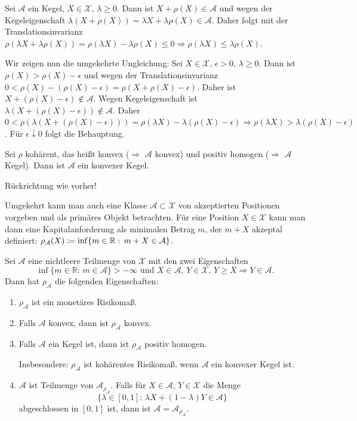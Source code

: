 \documentclass[a4paper,twoside,DIV15,BCOR12mm]{scrbook}
\begin{document}
\begin{beweis}
\begin{enumerate}
Sei $\mathcal{A}$ ein Kegel, $X\in\mathcal{X},\, \lambda\geq 0$. Dann ist $X+\rho(X)\in\mathcal{A}$ und wegen der Kegeleigenschaft $\lambda(X+\rho(X))=\lambda X+\lambda \rho(X)\in\mathcal{A}$. Daher folgt mit der Translationsinvarianz $\rho(\lambda X+\lambda \rho(X))=\rho(\lambda X)-\lambda \rho(X)\leq 0 \Rightarrow \rho(\lambda X)\leq \lambda \rho(X)$.

Wir zeigen nun die umgekehrte Ungleichung: Sei $X\in\mathcal{X},\, \epsilon>0,\, \lambda\geq 0$. Dann ist $\rho(X)>\rho(X)-\epsilon$ und wegen der Translationsinvarianz $0<\rho(X)-(\rho(X)-\epsilon)=\rho(X+\rho(X)-\epsilon)$. Daher ist $X+(\rho(X)-\epsilon)\notin\mathcal{A}$. Wegen Kegeleigenschaft ist $\lambda(X+(\rho(X)-\epsilon))\notin\mathcal{A}$. Daher $0<\rho(\lambda(X+(\rho(X)-\epsilon)))=\rho(\lambda X)-\lambda(\rho(X)-\epsilon) \Rightarrow \rho(\lambda X)>\lambda(\rho(X)-\epsilon)$. Für $\epsilon \downarrow 0$ folgt die Behauptung.

Sei $\rho$ kohärent, das heißt konvex ($\Rightarrow$ $\mathcal{A}$ konvex) und positiv homogen ($\Rightarrow$ $\mathcal{A}$ Kegel). Dann ist $\mathcal{A}$ ein konvexer Kegel.

Rückrichtung wie vorher!
\end{enumerate}
\end{beweis}

Umgekehrt kann man auch eine Klasse $\mathcal{A}\subset \mathcal{X}$ von akzeptierten Positionen vorgeben und als primäres Objekt betrachten. Für eine Position $X\in\mathcal{X}$ kann man dann eine Kapitalanforderung als minimalen Betrag $m$, der $m+X$ akzeptal definiert: $\rho_\mathcal{A}(X)\da\inf\{m\in\mathbb{R}:\, m+X\in\mathcal{A}\}$.

\begin{satz}
Sei $\mathcal{A}$ eine nichtleere Teilmenge von $\mathcal{X}$ mit den zwei Eigenschaften
\[
\inf\{m\in\mathbb{R}:\, m\in\mathcal{A}\}>-\infty \text{ und } X\in\mathcal{A},\, Y\in\mathcal{X},\, Y\geq X \Rightarrow Y\in\mathcal{A}.
\]
Dann hat $\rho_\mathcal{A}$ die folgenden Eigenschaften:
\begin{enumerate}
\item $\rho_\mathcal{A}$ ist ein monetäres Risikomaß.
\item Falls $\mathcal{A}$ konvex, dann ist $\rho_\mathcal{A}$ konvex.
\item Falls $\mathcal{A}$ ein Kegel ist, dann ist $\rho_\mathcal{A}$ positiv homogen.

Insbesondere: $\rho_\mathcal{A}$ ist kohärentes Risikomaß, wenn $\mathcal{A}$ ein konvexer Kegel ist.
\item $\mathcal{A}$ ist Teilmenge von $\mathcal{A}_{\rho_\mathcal{A}}$. Falls für $X\in\mathcal{A},\, Y\in\mathcal{X}$ die Menge 
\[
\{\lambda\in [0, 1]:\, \lambda X+(1-\lambda)Y\in\mathcal{A}\}
\]
abgeschlossen in $[0, 1]$ ist, dann ist $\mathcal{A}=\mathcal{A}_{\rho_\mathcal{A}}$.
\end{enumerate}
\end{satz}
\end{document}
